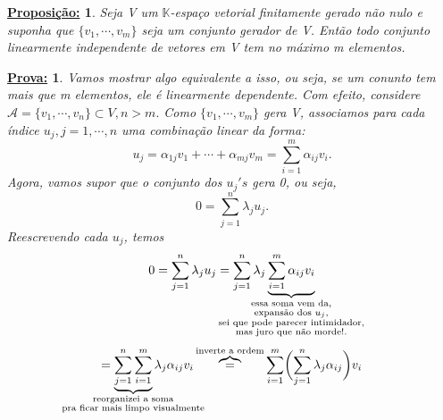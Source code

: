 \documentclass{article}
\newtheorem*{proposition*}{\underline{Proposi\c c\~ao:}}
\newtheorem*{proof*}{\underline{Prova:}}
\begin{document}
\begin{proposition*}
	Seja V um $\mathbb{K}$-espa\c co vetorial finitamente gerado n\~ao nulo e suponha que $\{v_1, \cdots, v_m\}$ seja
	um conjunto gerador de V. Ent\~ao todo conjunto linearmente independente de vetores em V tem no m\'aximo m elementos.
\end{proposition*}
\begin{proof*}
	Vamos mostrar algo equivalente a isso, ou seja, se um conunto tem mais que m elementos, ele \'e linearmente dependente.
	Com efeito, considere $\mathcal{A} = \{v_1, \cdots, v_n\} \subset{V}, n > m.$ Como $\{v_1, \cdots, v_m\}$ gera V, associamos
	para cada \'indice $u_j, j = 1, \cdots, n$ uma combina\c c\~ao linear da forma:
	$$
		u_{j} = \alpha_{1j}v_1 + \cdots + \alpha_{mj}v_m = \sum_{i=1}^{m} \alpha_{ij}v_i.
	$$
	Agora, vamos supor que o conjunto dos $u_{j}'s$ gera 0, ou seja,
	$$
		0 = \sum_{j=1}^{n} \lambda_{j}u_{j}.
	$$
	Reescrevendo cada $u_{j}$, temos
	$$
		0 = \sum_{j=1}^{n} \lambda_{j}u_{j} = \sum_{j=1}^{n}\lambda_{j}\underbrace{\sum_{i=1}^{m}{\alpha_{ij}v_i}}_{\mathclap{\substack{\text{essa soma vem da}, \\ \text{expans\~ao dos } u_j, \\ \text{sei que pode parecer intimidador,} \\ \text{mas juro que n\~ao morde!}.}}}
	$$
	$$
		= \underbrace{\sum_{j=1}^{n}\sum_{i=1}^{m}}_{\mathclap{\substack{\text{reorganizei a soma} \\ \text{pra ficar mais limpo visualmente}}}} \lambda_{j}\alpha_{ij}v_{i} \overbrace{=}^{\text{inverte a ordem}} \sum_{i=1}^{m}\biggl(\sum_{j=1}^{n}\lambda_{j}\alpha_{ij}\biggr)v_{i}
	$$


\end{proof*}
\end{document}
